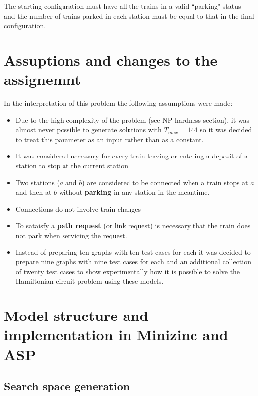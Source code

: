 \documentclass[11pt]{article}
\begin{document}
The starting configuration must have all the trains in a valid ``parking" status and 
the number of trains parked in each station must be equal to that in 
the final configuration. 

\section{Assuptions and changes to the assignemnt}

In the interpretation of this problem the following assumptions were made:

\begin{itemize}

\item Due to the high complexity of the problem (see NP-hardness section), it was
almost never possible to generate solutions with $T_{max}=144$ so it was decided
to treat this parameter as an input rather than as a constant.
 
\item It was considered necessary for every train leaving or entering a deposit of a station
to stop at the current station. 

\item Two stations ($a$ and $b$) are considered to be connected when a train stops at $a$
and then at $b$ without \textbf{parking} in any station in the meantime.

\item Connections do not involve train changes

\item To sataisfy a \textbf{path request} (or link request) is necessary that the train does 
not park when servicing the request.

\item Instead of preparing ten graphs with ten test cases for each it was decided to prepare
nine graphs with nine test cases for each and an additional collection of twenty test cases
to show experimentally how it is possible to solve the Hamiltonian circuit problem using these models.

\end{itemize}


\section{Model structure and implementation in Minizinc and ASP}

\subsection{Search space generation}
\begin{verbatim}

\end{verbatim}
\end{document}
